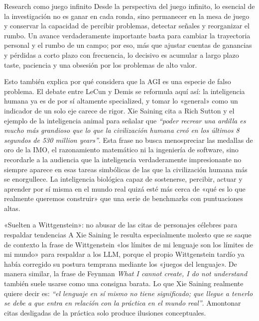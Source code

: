 \documentclass[a4paper,12pt]{article}
\begin{document}
\begin{importantbox}{Research como juego infinito}
Desde la perspectiva del juego infinito, lo esencial de la investigación no es ganar en cada ronda, sino permanecer en la mesa de juego y conservar la capacidad de percibir problemas, detectar señales y reorganizar el rumbo. Un avance verdaderamente importante basta para cambiar la trayectoria personal y el rumbo de un campo; por eso, más que ajustar cuentas de ganancias y pérdidas a corto plazo con frecuencia, lo decisivo es acumular a largo plazo taste, paciencia y una obsesión por los problemas de alto valor.
\end{importantbox}

Esto también explica por qué considera que la AGI es una especie de falso problema. El debate entre LeCun y Demis se reformula aquí así: la inteligencia humana ya es de por sí altamente specialized, y tomar lo «general» como un indicador de un solo eje carece de rigor. Xie Saining cita a Rich Sutton y el ejemplo de la inteligencia animal para señalar que \textit{``poder recrear una ardilla es mucho más grandioso que lo que la civilización humana creó en los últimos 8 segundos de 530 million years''}. Esta frase no busca menospreciar las medallas de oro de la IMO, el razonamiento matemático ni la ingeniería de software, sino recordarle a la audiencia que la inteligencia verdaderamente impresionante no siempre aparece en esas tareas simbólicas de las que la civilización humana más se enorgullece. La inteligencia biológica capaz de sostenerse, percibir, actuar y aprender por sí misma en el mundo real quizá esté más cerca de «qué es lo que realmente queremos construir» que una serie de benchmarks con puntuaciones altas.

\begin{warningbox}{«Suelten a Wittgenstein»: no abusar de las citas de personajes célebres para respaldar tendencias}
A Xie Saining le resulta especialmente molesto que se saque de contexto la frase de Wittgenstein «los límites de mi lenguaje son los límites de mi mundo» para respaldar a los LLM, porque el propio Wittgenstein tardío ya había corregido su postura temprana mediante los «juegos del lenguaje». De manera similar, la frase de Feynman \textit{What I cannot create, I do not understand} también suele usarse como una consigna barata. Lo que Xie Saining realmente quiere decir es: \textit{``el lenguaje en sí mismo no tiene significado; que llegue a tenerlo se debe a que entra en relación con la práctica en el mundo real''}. Amontonar citas desligadas de la práctica solo produce ilusiones conceptuales.
\end{warningbox}
\end{document}
